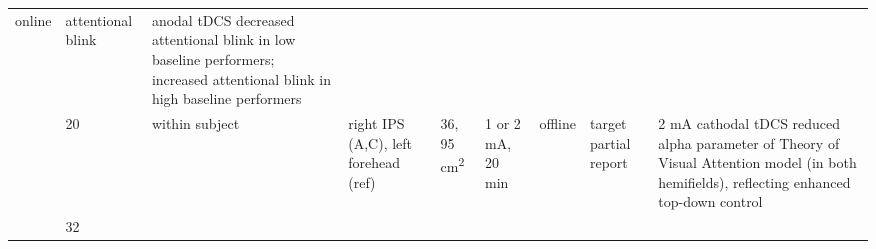\documentclass[11pt,]{memoir}
\begin{document}
\begin{longtable}[]{@{}lllllllll@{}}
\begin{minipage}[t]{0.05\columnwidth}
online\strut
\end{minipage} & \begin{minipage}[t]{0.08\columnwidth}\raggedright
attentional
blink\strut
\end{minipage} & \begin{minipage}[t]{0.27\columnwidth}\raggedright
anodal tDCS decreased attentional blink in low
baseline performers; increased attentional blink
in high baseline performers\strut
\end{minipage}\tabularnewline
\begin{minipage}[t]{0.08\columnwidth}\raggedright
\textcite{Moos2012}\strut
\end{minipage} & \begin{minipage}[t]{0.03\columnwidth}\raggedright
20\strut
\end{minipage} & \begin{minipage}[t]{0.05\columnwidth}\raggedright
within
subject\strut
\end{minipage} & \begin{minipage}[t]{0.12\columnwidth}\raggedright
right IPS (A,C),
left forehead (ref)\strut
\end{minipage} & \begin{minipage}[t]{0.04\columnwidth}\raggedright
36,
95
cm\textsuperscript{2}\strut
\end{minipage} & \begin{minipage}[t]{0.05\columnwidth}\raggedright
1 or 2
mA, 20
min\strut
\end{minipage} & \begin{minipage}[t]{0.05\columnwidth}\raggedright
offline\strut
\end{minipage} & \begin{minipage}[t]{0.08\columnwidth}\raggedright
target
partial
report\strut
\end{minipage} & \begin{minipage}[t]{0.27\columnwidth}\raggedright
2 mA cathodal tDCS reduced alpha parameter of
Theory of Visual Attention model (in both
hemifields), reflecting enhanced top-down control\strut
\end{minipage}\tabularnewline
\begin{minipage}[t]{0.08\columnwidth}\raggedright
\textcite{Roe2016}\strut
\end{minipage} & \begin{minipage}[t]{0.03\columnwidth}\raggedright
32\strut
\end{minipage} & \begin{minipage}[t]{0.05\columnwidth}\raggedright

\end{minipage}
\end{longtable}
\end{document}
